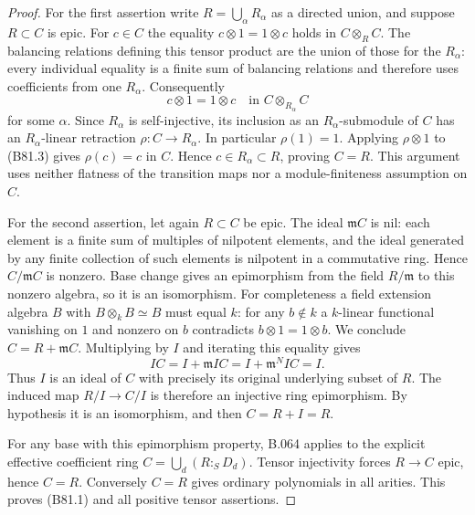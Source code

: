 \begin{proof}
For the first assertion write $R=\bigcup_\alpha R_\alpha$ as a directed
union, and suppose $R\subset C$ is epic. For $c\in C$ the equality
$c\otimes1=1\otimes c$ holds in $C\otimes_R C$. The balancing
relations defining this tensor product are the union of those for
the $R_\alpha$: every individual equality is a finite sum of
balancing relations and therefore uses coefficients from one
$R_\alpha$. Consequently
\[
          c\otimes1=1\otimes c
                   \quad\text{in }C\otimes_{R_\alpha}C
                                                        \tag{B81.3}
\]
for some $\alpha$. Since $R_\alpha$ is self-injective, its inclusion
as an $R_\alpha$-submodule of $C$ has an $R_\alpha$-linear retraction
$\rho:C\to R_\alpha$. In particular $\rho(1)=1$.
Applying $\rho\otimes1$ to (B81.3) gives $\rho(c)=c$ in $C$.
Hence $c\in R_\alpha\subset R$, proving $C=R$. This argument uses
neither flatness of the transition maps nor a module-finiteness
assumption on $C$.

For the second assertion, let again $R\subset C$ be epic. The ideal
$\mathfrak mC$ is nil: each element is a finite sum of multiples of
nilpotent elements, and the ideal generated by any finite collection
of such elements is nilpotent in a commutative ring. Hence
$C/\mathfrak mC$ is nonzero. Base change gives an epimorphism from
the field $R/\mathfrak m$ to this nonzero algebra, so it is an
isomorphism. For completeness a field extension algebra $B$ with
$B\otimes_kB\simeq B$ must equal $k$: for any $b\notin k$ a
$k$-linear functional vanishing on $1$ and nonzero on $b$ contradicts
$b\otimes1=1\otimes b$. We conclude $C=R+\mathfrak mC$.
Multiplying by $I$ and iterating this equality gives
\[
                 IC=I+\mathfrak mIC
                    =I+\mathfrak m^NIC=I.               \tag{B81.4}
\]
Thus $I$ is an ideal of $C$ with precisely its original underlying
subset of $R$. The induced map $R/I\to C/I$ is therefore an
injective ring epimorphism. By hypothesis it is an isomorphism, and
then $C=R+I=R$.

For any base with this epimorphism property, B.064 applies to the
explicit effective coefficient ring $C=\bigcup_d(R:_S D_d)$.
Tensor injectivity forces $R\to C$ epic, hence $C=R$. Conversely
$C=R$ gives ordinary polynomials in all arities. This proves (B81.1)
and all positive tensor assertions.


\end{proof}
